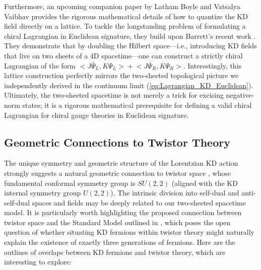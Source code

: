 Furthermore, an upcoming companion paper by Latham Boyle and Vatsalya Vaibhav \cite{BoyleVaibhav} provides the rigorous mathematical details of how to quantize the KD field directly on a lattice. To tackle the longstanding problem of formulating a chiral Lagrangian in Euclidean signature, they build upon Barrett's recent work \cite{Barrett2024}. They demonstrate that by doubling the Hilbert space—i.e., introducing KD fields that live on two sheets of a 4D spacetime—one can construct a strictly chiral Lagrangian of the form $\big<J\bar{\Psi}_L,K\Psi_L\big>+\big<J\bar{\Psi}_R,K\Psi_R\big>$. Interestingly, this lattice construction perfectly mirrors the two-sheeted topological picture we independently derived in the continuum limit (\cref{eq:Lagrangian_KD_Euclidean}). Ultimately, the two-sheeted spacetime is not merely a trick for excising negative-norm states; it is a rigorous mathematical prerequisite for defining a valid chiral Lagrangian for chiral gauge theories in Euclidean signature.

\subsection{Geometric Connections to Twistor Theory}

The unique symmetry and geometric structure of the Lorentzian KD action strongly suggests a natural geometric connection to twistor space \cite{Penrose:1985bww, Penrose:1986ca, adamo2018lecturestwistortheory}, whose fundamental conformal symmetry group is $SU(2,2)$ (aligned with the KD internal symmetry group $U(2,2)$). The intrinsic division into self-dual and anti-self-dual spaces and fields may be deeply related to our two-sheeted spacetime model. It is particularly worth highlighting the proposed connection between twistor space and the Standard Model outlined in \cite{woit2021euclideantwistorunification}, which poses the open question of whether situating KD fermions within twistor theory might naturally explain the existence of exactly three generations of fermions. Here are the outlines of overlaps between KD fermions and twistor theory, which are interesting to explore:


